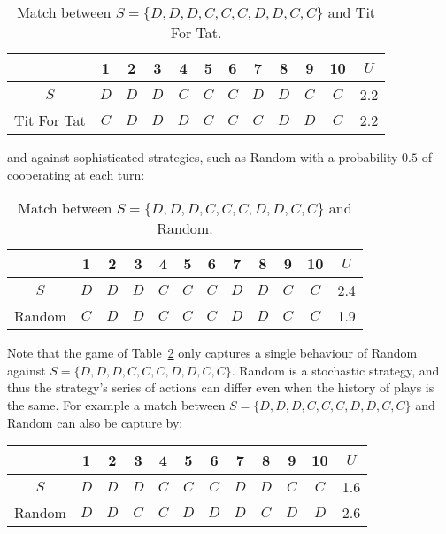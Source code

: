 \begin{table}[htb]
\centering
\begin{tabular}{cccccccccccc}
    & \textbf{1} & \textbf{2} & \textbf{3} & \textbf{4}  & \textbf{5} & \textbf{6} & \textbf{7} & \textbf{8}  & \textbf{9} & \textbf{10} & \(U\) \\ \midrule
    \(S\) & \(D\) & \(D\) & \(D\) & \(C\) & \(C\) & \(C\) & \(D\) & \(D\) & \(C\) & \(C\) & 2.2 \\
    Tit For Tat & \(C\) & \(D\) & \(D\) & \(D\) & \(C\) & \(C\) & \(C\) & \(D\) & \(D\) & \(C\) & 2.2 \\ \bottomrule
\end{tabular}
\caption{Match between \(S = \{D, D, D, C, C, C, D, D, C, C\}\) and Tit For Tat.}\label{table:s_vs_tft}
\end{table}

and against sophisticated strategies, such as Random with a probability \(0.5\)
of cooperating at each turn:

\begin{table}[htb]
\centering
\begin{tabular}{cccccccccccc}
    & \textbf{1} & \textbf{2} & \textbf{3} & \textbf{4}  & \textbf{5} & \textbf{6} & \textbf{7} & \textbf{8}  & \textbf{9} & \textbf{10} & \(U\) \\ \midrule
    \(S\) & \(D\) & \(D\) & \(D\) & \(C\) & \(C\) & \(C\) & \(D\) & \(D\) & \(C\) & \(C\) & 2.4 \\
    Random & \(C\) & \(D\) & \(D\) & \(C\) & \(C\) & \(C\) & \(D\) & \(D\) & \(C\) & \(C\) & 1.9 \\ \bottomrule
\end{tabular}
\caption{Match between \(S = \{D, D, D, C, C, C, D, D, C, C\}\) and Random.}\label{table:s_vs_random}
\end{table}

Note that the game of Table~\ref{table:s_vs_random} only captures a single
behaviour of Random against \(S = \{D, D, D, C, C, C, D, D, C, C\}\). Random is
a stochastic strategy, and thus the strategy's series of actions can differ even
when the history of plays is the same. For example a match between \(S = \{D, D,
D, C, C, C, D, D, C, C\}\) and Random can also be capture by:

\begin{table}[htb]
    \centering
    \begin{tabular}{cccccccccccc}
        & \textbf{1} & \textbf{2} & \textbf{3} & \textbf{4}  & \textbf{5} & \textbf{6} & \textbf{7} & \textbf{8}  & \textbf{9} & \textbf{10} & \(U\) \\ \midrule
        \(S\) & \(D\) & \(D\) & \(D\) & \(C\) & \(C\) & \(C\) & \(D\) & \(D\) & \(C\) & \(C\) & 1.6 \\
        Random & \(D\) &\(D\) &\(C\) &\(C\) &\(D\) &\(D\) &\(D\) &\(C\) &\(D\) &\(D\) & 2.6 \\ \bottomrule
    \end{tabular}
\end{table}


